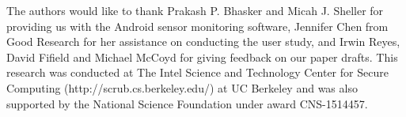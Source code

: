 \begin{acks}
The authors would like to thank Prakash P. Bhasker and Micah J. Sheller for providing us with the Android sensor monitoring software, Jennifer Chen from Good Research for her assistance on conducting the user study, and Irwin Reyes, David Fifield and Michael McCoyd for giving feedback on our paper drafts.
This research was conducted at The Intel Science and Technology Center for Secure Computing (http://scrub.cs.berkeley.edu/) at UC Berkeley and was also supported by the National Science Foundation under award CNS-1514457.
\end{acks}
